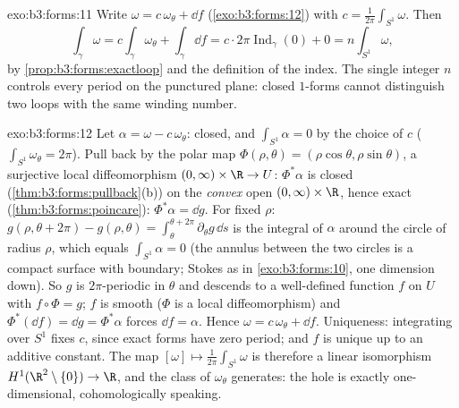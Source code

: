 \begin{solution}{exo:b3:forms:11}
Write $\omega = c\,\omega_\theta + \dd f$
(\cref{exo:b3:forms:12}) with $c =
\frac1{2\pi}\int_{S^1}\omega$. Then
\[
\int_\gamma\omega = c\int_\gamma\omega_\theta +
\int_\gamma\dd f
= c\cdot2\pi\operatorname{Ind}_\gamma(0) + 0
= n\int_{S^1}\omega,
\]
by \cref{prop:b3:forms:exactloop} and the definition of the
index. The single integer $n$ controls every period on the
punctured plane: closed $1$-forms cannot distinguish two
loops with the same winding number.
\end{solution}

\begin{solution}{exo:b3:forms:12}
Let $\alpha = \omega - c\,\omega_\theta$: closed, and
$\int_{S^1}\alpha = 0$ by the choice of $c$
($\int_{S^1}\omega_\theta = 2\pi$). Pull back by the polar
map $\Phi(\rho, \theta) = (\rho\cos\theta, \rho\sin\theta)$,
a surjective local diffeomorphism $(0, \infty)\times\R \to
U$: $\Phi^*\alpha$ is closed
(\cref{thm:b3:forms:pullback}(b)) on the \emph{convex} open
$(0,\infty)\times\R$, hence exact
(\cref{thm:b3:forms:poincare}): $\Phi^*\alpha = \dd g$.
For fixed $\rho$: $g(\rho, \theta + 2\pi) - g(\rho, \theta)
= \int_\theta^{\theta + 2\pi}\partial_\theta g\,\dd s$ is
the integral of $\alpha$ around the circle of radius
$\rho$, which equals $\int_{S^1}\alpha = 0$ (the annulus
between the two circles is a compact surface with boundary;
Stokes as in \cref{exo:b3:forms:10}, one dimension down).
So $g$ is $2\pi$-periodic in $\theta$ and descends to a
well-defined function $f$ on $U$ with $f\circ\Phi = g$;
$f$ is smooth ($\Phi$ is a local diffeomorphism) and
$\Phi^*(\dd f) = \dd g = \Phi^*\alpha$ forces $\dd f =
\alpha$. Hence $\omega = c\,\omega_\theta + \dd f$.
Uniqueness: integrating over $S^1$ fixes $c$, since exact
forms have zero period; and $f$ is unique up to an additive
constant. The map $[\omega] \mapsto
\frac1{2\pi}\int_{S^1}\omega$ is therefore a linear
isomorphism $H^1(\R^2\setminus\{0\}) \to \R$, and the class
of $\omega_\theta$ generates: the hole is exactly
one-dimensional, cohomologically speaking.
\end{solution}


